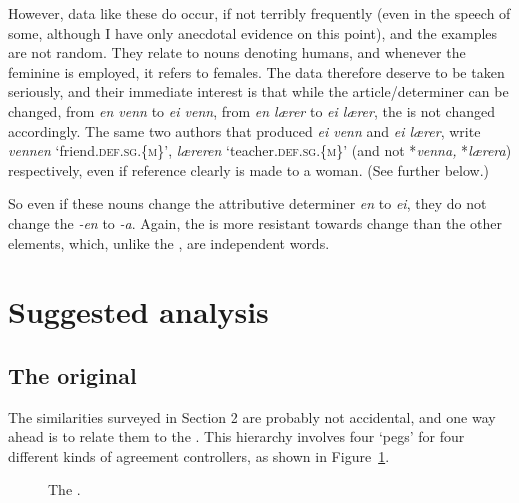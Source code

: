 \documentclass[output=paper]{langsci/langscibook}
\begin{document}
\begin{exe}
\begin{xlist}
\begin{xlist}
However, data like these do occur, if not terribly frequently (even in
the speech of some, although I have only anecdotal evidence on this point), and the examples are not random. They relate to nouns denoting
humans, and whenever the feminine is employed, it refers to females. The
data therefore deserve to be taken seriously, and their immediate
interest is that while the article/determiner can be changed, from
\emph{en venn} to \emph{ei venn}, from \emph{en lærer} to \emph{ei
lærer}, the  is not changed accordingly. The same two authors that
produced \emph{ei venn} and \emph{ei lærer}, write \emph{vennen}
`friend.\textsc{def}.\textsc{sg}.\{\textsc{m}\}', \emph{læreren} `teacher.\textsc{def}.\textsc{sg}.\{\textsc{m}\}' (and not
*\emph{venna,} *\emph{lærera}) respectively, even if reference clearly
is made to a woman. (See further  below.)

So even if these nouns change the attributive determiner \emph{en} to
\emph{ei}, they do not change the  \emph{-en} to \emph{-a}. Again,
the  is more resistant towards change than the other elements,
which, unlike the , are independent words.

\section{Suggested analysis}

\subsection{The original }

The similarities surveyed in Section 2 are probably not accidental, and one way ahead is to relate them to the  %
\citep{Corbett79,Corbett2006}%
%
.
This hierarchy involves four `pegs' for four different kinds of
agreement controllers, as shown in Figure~\ref{fig:Enger:agree1}.
\begin{figure}

\caption{The .}
\label{fig:Enger:agree1}
\end{figure}


\end{xlist}
\end{xlist}
\end{exe}
\end{document}
